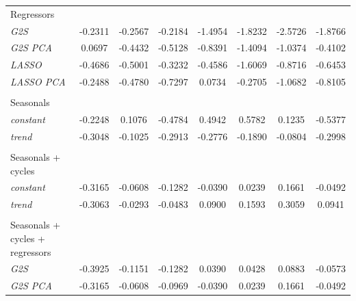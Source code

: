 \begin{tabular}{lccccccc}
\\
Regressors \\
\quad \textit{G2S} & -0.2311 & -0.2567 & -0.2184 & -1.4954 & -1.8232 & -2.5726 & -1.8766\\
\quad \textit{G2S PCA} & 0.0697 & -0.4432 & -0.5128 & -0.8391 & -1.4094 & -1.0374 & -0.4102\\
\quad \textit{LASSO} & -0.4686 & -0.5001 & -0.3232 & -0.4586 & -1.6069 & -0.8716 & -0.6453\\
\quad \textit{LASSO PCA} & -0.2488 & -0.4780 & -0.7297 & 0.0734 & -0.2705 & -1.0682 & -0.8105\\
\\
Seasonals \\
\quad \textit{constant} & -0.2248 & 0.1076 & -0.4784 & 0.4942 & 0.5782 & 0.1235 & -0.5377\\
\quad \textit{trend} & -0.3048 & -0.1025 & -0.2913 & -0.2776 & -0.1890 & -0.0804 & -0.2998\\
\\
Seasonals + cycles \\
\quad \textit{constant} & -0.3165 & -0.0608 & -0.1282 & -0.0390 & 0.0239 & 0.1661 & -0.0492\\
\quad \textit{trend} & -0.3063 & -0.0293 & -0.0483 & 0.0900 & 0.1593 & 0.3059 & 0.0941\\
\\
Seasonals + cycles + regressors \\
\quad \textit{G2S} & -0.3925 & -0.1151 & -0.1282 & 0.0390 & 0.0428 & 0.0883 & -0.0573\\
\quad \textit{G2S PCA} & -0.3165 & -0.0608 & -0.0969 & -0.0390 & 0.0239 & 0.1661 & -0.0492\\
\bottomrule
\end{tabular}
